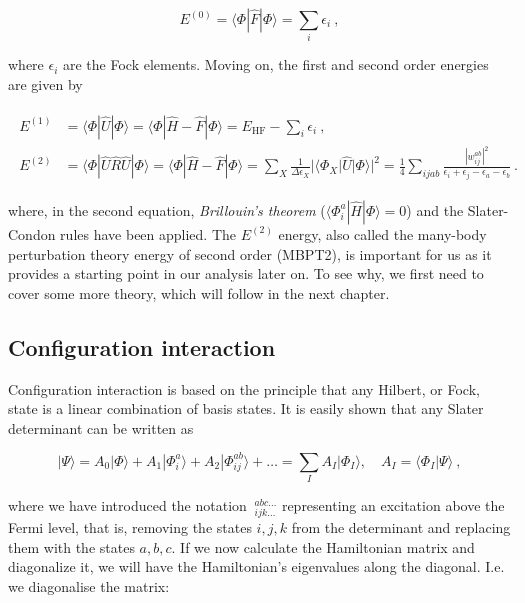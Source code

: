 \documentclass[10pt,twoside]{report}
\begin{document}
	\begin{equation}
		E^{(0)} = \langle\Phi|\hat{F}|\Phi\rangle = \sum_i\epsilon_i\:,
	\end{equation}
	
	\noindent where $\epsilon_i$ are the Fock elements. Moving on, the first and second order energies are given by \cite{Kvaal15}
	
	\begin{align}
	\begin{split}
		E^{(1)} &= \langle\Phi|\hat{U}|\Phi\rangle = \langle\Phi|\hat{H}-\hat{F}|\Phi\rangle = E_{\text{HF}} - \sum_i \epsilon_i \:, \\
		E^{(2)} &= \langle\Phi|\hat{U}\hat{R}\hat{U}|\Phi\rangle = \langle\Phi|\hat{H}-\hat{F}|\Phi\rangle =\sum_X \frac{1}{\Delta\epsilon_X}|\langle\Phi_X|\hat{U}|\Phi\rangle|^2 = \frac{1}{4}\sum_{ijab}\frac{|w_{ij}^{ab}|^2}{\epsilon_i+\epsilon_j-\epsilon_a-\epsilon_b}\:.
		\end{split}
	\end{align}
	
	\noindent where, in the second equation, \emph{Brillouin's theorem} ($\langle\Phi_i^a|\hat{H}|\Phi\rangle = 0$) and the Slater-Condon rules have been applied. The $E^{(2)}$ energy, also called the many-body perturbation theory energy of second order (MBPT2), is important for us as it provides a starting point in our analysis later on. To see why, we first need to cover some more theory, which will follow in the next chapter.
	
	\subsection{Configuration interaction}
	Configuration interaction is based on the principle that any Hilbert, or Fock, state is a linear combination of basis states. It is easily shown that any Slater determinant can be written as
	
	\begin{equation}
	|\Psi\rangle = A_0|\Phi\rangle + A_1|\Phi_i^a\rangle + A_2|\Phi_{ij}^{ab}\rangle + \ldots = \sum_I A_I|\Phi_I\rangle ,\quad A_I = \langle\Phi_I|\Psi\rangle \:,
	\end{equation}
	
	\noindent where we have introduced the notation $\:_{ijk\ldots}^{abc\ldots}$ representing an excitation above the Fermi level, that is, removing the states $i,j,k$ from the determinant and replacing them with the states $a,b,c$. If we now calculate the Hamiltonian matrix and diagonalize it, we will have the Hamiltonian's eigenvalues along the diagonal. I.e. we diagonalise the matrix:
	
\end{document}
